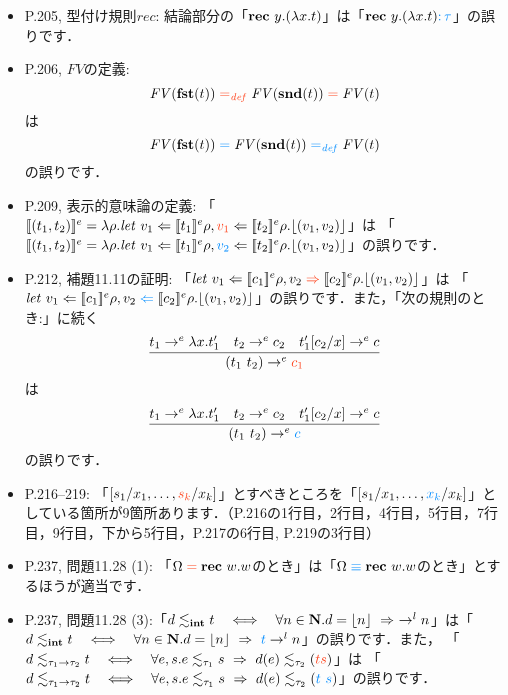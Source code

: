 \documentclass[12pt,titlepage,twoside,openright,dvipdfmx]{jsbook}
\newcommand\old[1]{%
  \textcolor[rgb]{1.0,0.25,0.1}{#1}%
  }
\newcommand\new[1]{%
  \textcolor[rgb]{0,0.55,1.0}{#1}%
  }
\theoremstyle{definition}
\begin{document}
\begin{itemize}
\item P.205, 型付け規則$\mathit{rec}$: 結論部分の「${\bf rec}\ {y.(\lambda x.t)}$」は「$\rec{y.(\lambda x.t)}\new{ \COL \tau}$」の誤りです．
\item P.206, $\mathit{FV}$の定義:
  \[
    \mathit{FV}(\fst(t)) \old{{}=_{\mathit{def}}{}} \mathit{FV}(\snd(t)) \old{{}={}} \mathit{FV}(t)
  \]
  は
  \[
    \mathit{FV}(\fst(t)) \new{{}={}} \mathit{FV}(\snd(t)) \new{{}=_{\mathit{def}}{}} \mathit{FV}(t)
  \]
  の誤りです．
\item P.209, 表示的意味論の定義:
  「$\eden{(t_1,t_2)} = \lambda\rho.{\it let}\ v_1\Leftarrow\eden{t_1}\rho, \old{v_1}\Leftarrow\eden{t_2}\rho.\floor{(v_1,v_2)}$」は
  「$\eden{(t_1,t_2)} = \lambda\rho.{\it let}\ v_1\Leftarrow\eden{t_1}\rho, \new{v_2}\Leftarrow\eden{t_2}\rho.\floor{(v_1,v_2)}$」の誤りです．
\item P.212, 補題11.11の証明:
  「$\mathit{let}\ v_1\Leftarrow\eden{c_1}\rho,v_2\old{{}\Rightarrow{}}\eden{c_2}\rho.\floor{(v_1,v_2)}$」は
  「$\mathit{let}\ v_1\Leftarrow\eden{c_1}\rho,v_2\new{{}\Leftarrow{}}\eden{c_2}\rho.\floor{(v_1,v_2)}$」の誤りです．また，「次の規則のとき:」に続く
   \[
     \infer{(t_1\ t_2)\to^e \old{c_1}}{
       t_1\to^e\lambda x.t'_1
       & t_2\to^e c_2
       & t'_1[c_2/x] \to^e c}
   \]
   は
   \[
     \infer{(t_1\ t_2)\to^e \new{c}}{
       t_1\to^e\lambda x.t'_1
       & t_2\to^e c_2
       & t'_1[c_2/x] \to^e c}
   \]
   の誤りです．
 \item P.216--219:
   「$[s_1/x_1,\ldots,\old{s_k}/x_k]$」とすべきところを「$[s_1/x_1,\ldots,\new{x_k}/x_k]$」としている箇所が9箇所あります．（P.216の1行目，2行目，4行目，5行目，7行目，9行目，下から5行目，P.217の6行目, P.219の3行目）
 \item P.237, 問題11.28 (1): 「$\Omega\old{{}={}}\rec{w.w}$のとき」は「$\Omega \new{{}\equiv{}} \rec{w.w}$のとき」とするほうが適当です．
 \item P.237, 問題11.28
   (3):「$d\lesssim_{\bf int} t \quad \Longleftrightarrow\quad \forall
   n\in{\bf N}.d=\lfloor{n}\rfloor \ \Rightarrow\ \to^l
   n$」は「$d\lesim_\typint t \quad \Longleftrightarrow\quad \forall
   n\in\Natu.d=\floor{n} \ \Rightarrow\ \new{t} \to^l n$」の誤りです．また，
   「$d\lesim_{\tau_1\typfun\tau_2}t \quad \Longleftrightarrow\quad
   \forall e,s.e\lesim_{\tau_1}s\ \Rightarrow\ d(e)\lesim_{\tau_2}(\old{t s})$」は
   「$d\lesim_{\tau_1\typfun\tau_2}t \quad \Longleftrightarrow\quad 
   \forall e,s.e\lesim_{\tau_1}s\ \Rightarrow\ d(e)\lesim_{\tau_2}(\new{t\ s})$」の誤りです．
\end{itemize}
\end{document}
